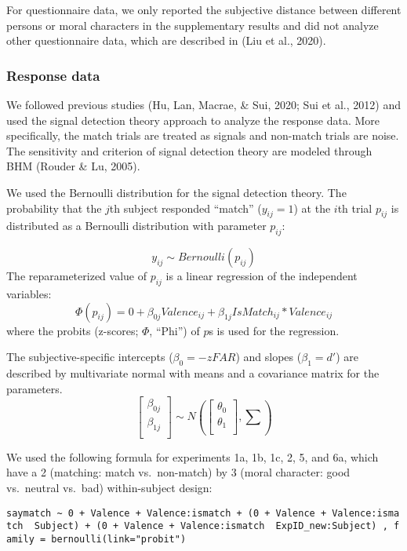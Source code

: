 \documentclass[
  man]{apa6}
\begin{document}
For questionnaire data, we only reported the subjective distance between different persons or moral characters in the supplementary results and did not analyze other questionnaire data, which are described in (Liu et al., 2020).

\hypertarget{response-data}{%
\subsubsection{Response data}\label{response-data}}

We followed previous studies (Hu, Lan, Macrae, \& Sui, 2020; Sui et al., 2012) and used the signal detection theory approach to analyze the response data. More specifically, the match trials are treated as signals and non-match trials are noise. The sensitivity and criterion of signal detection theory are modeled through BHM (Rouder \& Lu, 2005).

We used the Bernoulli distribution for the signal detection theory. The probability that the \(j\)th subject responded ``match'' (\(y_{ij} = 1\)) at the \(i\)th trial \(p_{ij}\) is distributed as a Bernoulli distribution with parameter \(p_{ij}\):

\[ y_{ij} \sim Bernoulli(p_{ij})\]
The reparameterized value of \(p_{ij}\) is a linear regression of the independent variables:
\[ \Phi(p_{ij}) = 0 + \beta_{0j}Valence_{ij} + \beta_{1j}IsMatch_{ij} * Valence_{ij}\]
where the probits (z-scores; \(\Phi\), ``Phi'') of \(p\)s is used for the regression.

The subjective-specific intercepts (\(\beta_{0} = -zFAR\)) and slopes (\(\beta_{1} = d'\)) are described by multivariate normal with means and a covariance matrix for the parameters.
\[ \begin{bmatrix}\beta_{0j}\\
\beta_{1j}\\
\end{bmatrix} \sim N(\begin{bmatrix}\theta_{0}\\
\theta_{1}\\
\end{bmatrix}, \sum) \]

We used the following formula for experiments 1a, 1b, 1c, 2, 5, and 6a, which have a 2 (matching: match vs.~non-match) by 3 (moral character: good vs.~neutral vs.~bad) within-subject design:

\texttt{saymatch\ \textasciitilde{}\ 0\ +\ Valence\ +\ Valence:ismatch\ +\ (0\ +\ Valence\ +\ Valence:ismatch\ \textbar{}\ Subject)\ +\ (0\ +\ Valence\ +\ Valence:ismatch\ \textbar{}\ ExpID\_new:Subject)\ ,\ family\ =\ bernoulli(link="probit")}
\end{document}
